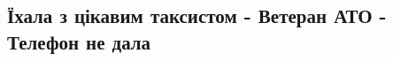  
 
 
 
 
\subsection{Їхала з цікавим таксистом - Ветеран АТО - Телефон не дала}
\label{sec:22_06_2020.fb.blaschuk_polina.1.taksist_vojna_ato_lugansk}

